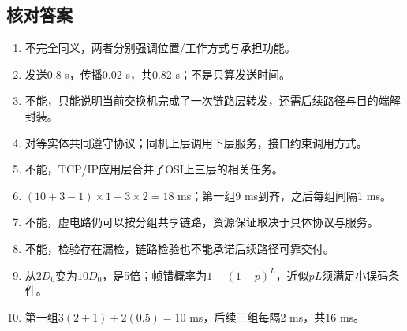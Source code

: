 \subsection{核对答案}\label{CN01-review-answers}

\begin{enumerate}
\def\labelenumi{\arabic{enumi}.}
\item
  不完全同义，两者分别强调位置/工作方式与承担功能。
\item
  发送0.8 s，传播0.02 s，共0.82 s；不是只算发送时间。
\item
  不能，只能说明当前交换机完成了一次链路层转发，还需后续路径与目的端解封装。
\item
  对等实体共同遵守协议；同机上层调用下层服务，接口约束调用方式。
\item
  不能，TCP/IP应用层合并了OSI上三层的相关任务。
\item
  \((10+3-1)\times1+3\times2=18\) ms；第一组9 ms到齐，之后每组间隔1 ms。
\item
  不能，虚电路仍可以按分组共享链路，资源保证取决于具体协议与服务。
\item
  不能，检验存在漏检，链路检验也不能承诺后续路径可靠交付。
\item
  从\(2D_0\)变为\(10D_0\)，是5倍；帧错概率为\(1-(1-p)^L\)，近似\(pL\)须满足小误码条件。
\item
  第一组\(3(2+1)+2(0.5)=10\) ms，后续三组每隔2 ms，共16 ms。
\end{enumerate}
